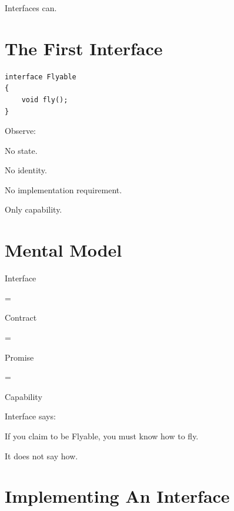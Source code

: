 \documentclass[11pt,a4paper]{book}
\begin{document}
Interfaces can.


\section{The First Interface}

\begin{verbatim}
interface Flyable
{
    void fly();
}
\end{verbatim}


Observe:

No state.

No identity.

No implementation requirement.


Only capability.


\section{Mental Model}

\begin{mentalmodel}

Interface

=

Contract

=

Promise

=

Capability

\end{mentalmodel}


Interface says:

\begin{center}
If you claim to be Flyable,
you must know how to fly.
\end{center}


It does not say how.


\section{Implementing An Interface}
\end{document}
